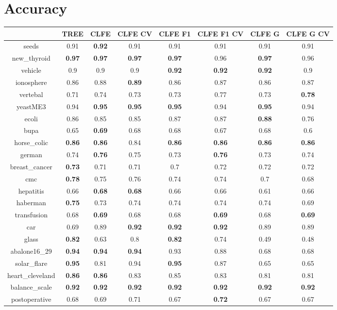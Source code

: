 \documentclass{article}%
\begin{document}
%
\normalsize%
\section*{Accuracy}%
\begin{tabular}{c|ccccccc}%
\hline%
&TREE&CLFE&CLFE CV&CLFE F1&CLFE F1 CV&CLFE G&CLFE G CV\\%
\hline%
seeds&0.91&\textbf{0.92}&0.91&0.91&0.91&0.91&0.91\\%
new\_thyroid&\textbf{0.97}&\textbf{0.97}&\textbf{0.97}&\textbf{0.97}&0.96&\textbf{0.97}&0.96\\%
vehicle&0.9&0.9&0.9&\textbf{0.92}&\textbf{0.92}&\textbf{0.92}&0.9\\%
ionosphere&0.86&0.88&\textbf{0.89}&0.86&0.87&0.86&0.87\\%
vertebal&0.71&0.74&0.73&0.73&0.77&0.73&\textbf{0.78}\\%
yeastME3&0.94&\textbf{0.95}&\textbf{0.95}&\textbf{0.95}&0.94&\textbf{0.95}&0.94\\%
ecoli&0.86&0.85&0.85&0.87&0.87&\textbf{0.88}&0.76\\%
bupa&0.65&\textbf{0.69}&0.68&0.68&0.67&0.68&0.6\\%
horse\_colic&\textbf{0.86}&\textbf{0.86}&0.84&\textbf{0.86}&\textbf{0.86}&\textbf{0.86}&\textbf{0.86}\\%
german&0.74&\textbf{0.76}&0.75&0.73&\textbf{0.76}&0.73&0.74\\%
breast\_cancer&\textbf{0.73}&0.71&0.71&0.7&0.72&0.72&0.72\\%
cmc&\textbf{0.78}&0.75&0.76&0.74&0.74&0.7&0.68\\%
hepatitis&0.66&\textbf{0.68}&\textbf{0.68}&0.66&0.66&0.61&0.66\\%
haberman&\textbf{0.75}&0.73&0.74&0.74&0.74&0.74&0.69\\%
transfusion&0.68&\textbf{0.69}&0.68&0.68&\textbf{0.69}&0.68&\textbf{0.69}\\%
car&0.69&0.89&\textbf{0.92}&\textbf{0.92}&\textbf{0.92}&0.89&0.89\\%
glass&\textbf{0.82}&0.63&0.8&\textbf{0.82}&0.74&0.49&0.48\\%
abalone16\_29&\textbf{0.94}&\textbf{0.94}&\textbf{0.94}&0.93&0.88&0.68&0.68\\%
solar\_flare&\textbf{0.95}&0.81&0.94&\textbf{0.95}&0.87&0.65&0.65\\%
heart\_cleveland&\textbf{0.86}&\textbf{0.86}&0.83&0.85&0.83&0.81&0.81\\%
balance\_scale&\textbf{0.92}&\textbf{0.92}&\textbf{0.92}&\textbf{0.92}&\textbf{0.92}&\textbf{0.92}&\textbf{0.92}\\%
postoperative&0.68&0.69&0.71&0.67&\textbf{0.72}&0.67&0.67\\%
\end{tabular}
\end{document}
